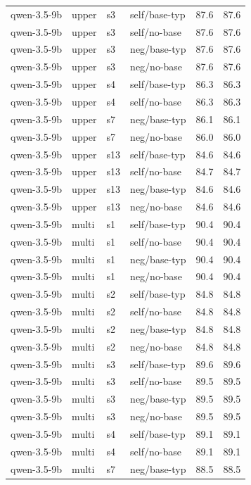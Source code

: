 {\begin{longtable}{llll rr}
qwen-3.5-9b & upper & s3 & self/base-typ & 87.6 & 87.6 \\
qwen-3.5-9b & upper & s3 & self/no-base & 87.6 & 87.6 \\
qwen-3.5-9b & upper & s3 & neg/base-typ & 87.6 & 87.6 \\
qwen-3.5-9b & upper & s3 & neg/no-base & 87.6 & 87.6 \\
qwen-3.5-9b & upper & s4 & self/base-typ & 86.3 & 86.3 \\
qwen-3.5-9b & upper & s4 & self/no-base & 86.3 & 86.3 \\
qwen-3.5-9b & upper & s7 & neg/base-typ & 86.1 & 86.1 \\
qwen-3.5-9b & upper & s7 & neg/no-base & 86.0 & 86.0 \\
qwen-3.5-9b & upper & s13 & self/base-typ & 84.6 & 84.6 \\
qwen-3.5-9b & upper & s13 & self/no-base & 84.7 & 84.7 \\
qwen-3.5-9b & upper & s13 & neg/base-typ & 84.6 & 84.6 \\
qwen-3.5-9b & upper & s13 & neg/no-base & 84.6 & 84.6 \\
\midrule
qwen-3.5-9b & multi & s1 & self/base-typ & 90.4 & 90.4 \\
qwen-3.5-9b & multi & s1 & self/no-base & 90.4 & 90.4 \\
qwen-3.5-9b & multi & s1 & neg/base-typ & 90.4 & 90.4 \\
qwen-3.5-9b & multi & s1 & neg/no-base & 90.4 & 90.4 \\
qwen-3.5-9b & multi & s2 & self/base-typ & 84.8 & 84.8 \\
qwen-3.5-9b & multi & s2 & self/no-base & 84.8 & 84.8 \\
qwen-3.5-9b & multi & s2 & neg/base-typ & 84.8 & 84.8 \\
qwen-3.5-9b & multi & s2 & neg/no-base & 84.8 & 84.8 \\
qwen-3.5-9b & multi & s3 & self/base-typ & 89.6 & 89.6 \\
qwen-3.5-9b & multi & s3 & self/no-base & 89.5 & 89.5 \\
qwen-3.5-9b & multi & s3 & neg/base-typ & 89.5 & 89.5 \\
qwen-3.5-9b & multi & s3 & neg/no-base & 89.5 & 89.5 \\
qwen-3.5-9b & multi & s4 & self/base-typ & 89.1 & 89.1 \\
qwen-3.5-9b & multi & s4 & self/no-base & 89.1 & 89.1 \\
qwen-3.5-9b & multi & s7 & neg/base-typ & 88.5 & 88.5 \\

\end{longtable}}
